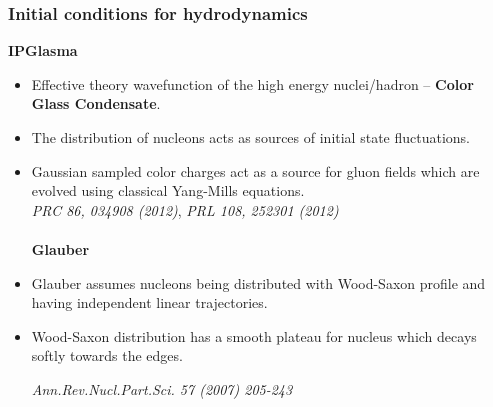 \documentclass[aspectratio=1610]{beamer}
\begin{document}
\begin{frame}
\frametitle{Initial conditions for hydrodynamics}


\hspace*{6mm} {\Large \textbf{IPGlasma}}


\begin{itemize}

\item Effective theory wavefunction of the high energy nuclei/hadron -- \textbf{Color Glass Condensate}.\\

\item The distribution of nucleons acts as sources of initial state fluctuations.\\

\item Gaussian sampled color charges act as a source for gluon fields which are evolved using classical Yang-Mills equations.\\


\textit{PRC 86, 034908 (2012)}, \textit{PRL 108, 252301 (2012)} \\~\\



 {\Large \textbf{Glauber}} 


\item Glauber assumes nucleons being distributed with Wood-Saxon profile and having independent linear trajectories. 

\item Wood-Saxon distribution has a smooth plateau for nucleus which decays softly towards the edges.


\textit{Ann.Rev.Nucl.Part.Sci. 57 (2007) 205-243}

\end{itemize}
\end{frame}

\end{document}

